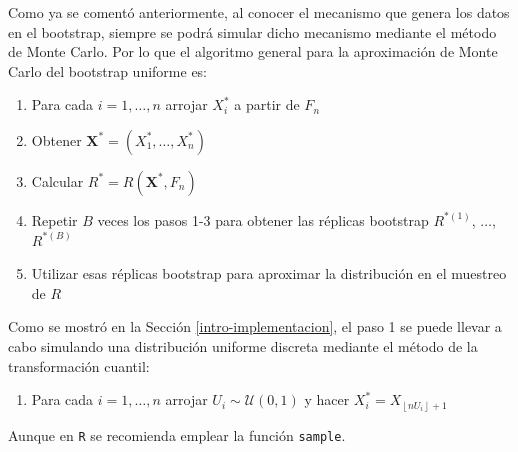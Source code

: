 \documentclass[
]{book}
\providecommand{\tightlist}{%
  \setlength{\itemsep}{0pt}\setlength{\parskip}{0pt}}
\renewcommand{\mathbf}[1]{\symbf{#1}}
\theoremstyle{break}
\theoremstyle{nonumberplain}
\begin{document}
Como ya se comentó anteriormente,
al conocer el mecanismo que genera los datos en el bootstrap,
siempre se podrá simular dicho mecanismo mediante el método de Monte
Carlo. Por lo que el algoritmo general para la aproximación de Monte Carlo del
bootstrap uniforme es:

\begin{enumerate}
\def\labelenumi{\arabic{enumi}.}
\item
  Para cada \(i=1,\ldots ,n\) arrojar \(X_i^{\ast}\) a partir de \(F_n\)
\item
  Obtener \(\mathbf{X}^{\ast}=\left( X_1^{\ast},\ldots
  ,X_n^{\ast} \right)\)
\item
  Calcular \(R^{\ast}=R\left( \mathbf{X}^{\ast},F_n \right)\)
\item
  Repetir \(B\) veces los pasos 1-3 para obtener las réplicas bootstrap
  \(R^{\ast (1)}\), \(\ldots\), \(R^{\ast (B)}\)
\item
  Utilizar esas réplicas bootstrap para aproximar la distribución en el
  muestreo de \(R\)
\end{enumerate}

Como se mostró en la Sección \ref{intro-implementacion}, el paso 1 se puede llevar a cabo simulando una distribución uniforme discreta
mediante el método de la transformación cuantil:

\begin{enumerate}
\def\labelenumi{\arabic{enumi}.}
\tightlist
\item
  Para cada \(i=1,\ldots ,n\) arrojar \(U_i\sim \mathcal{U}\left( 0,1 \right)\) y
  hacer \(X_i^{\ast}=X_{\left\lfloor nU_i\right\rfloor +1}\)
\end{enumerate}

Aunque en \texttt{R} se recomienda emplear la función \texttt{sample}.
\end{document}
